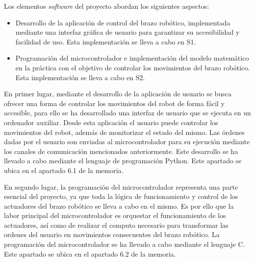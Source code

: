 Los elementos \textit{software} del proyecto abordan los siguientes aspectos:

\begin{itemize}
    \item Desarrollo de la aplicación de control del brazo robótico, implementada mediante una interfaz gráfica de usuario para garantizar su accesibilidad y facilidad de uso. Esta implementación se lleva a cabo en S1.
    \item Programación del microcontrolador e implementación del modelo matemático en la práctica con el objetivo de controlar los movimientos del brazo robótico. Esta implementación se lleva a cabo en S2.
\end{itemize}

En primer lugar, mediante el desarrollo de la aplicación de usuario se busca ofrecer una forma de controlar los movimientos del robot de forma fácil y accesible, para ello se ha desarrollado una interfaz de usuario que se ejecuta en un ordenador auxiliar. Desde esta aplicación el usuario puede controlar los movimientos del robot, además de monitorizar el estado del mismo. Las órdenes dadas por el usuario son enviadas al microcontrolador para su ejecución mediante los canales de comunicación mencionados anteriormente. Este desarrollo se ha llevado a cabo mediante el lenguaje de programación Python. Este apartado se ubica en el apartado 6.1 de la memoria.

En segundo lugar, la programación del microcontrolador representa una parte esencial del proyecto, ya que toda la lógica de funcionamiento y control de los actuadores del brazo robótico se lleva a cabo en el mismo. Es por ello que la labor principal del microcontrolador es orquestar el funcionamiento de los actuadores, así como de realizar el computo necesario para transformar las ordenes del usuario en movimientos consecuentes del brazo robótico. La programación del microcontrolador se ha llevado a cabo mediante el lenguaje C. Este apartado se ubica en el apartado 6.2 de la memoria.
